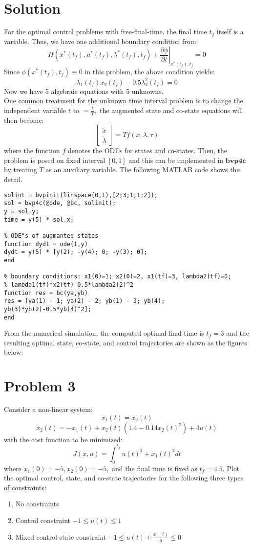 \documentclass[10pt,a4paper,oneside]{article}
\begin{document}
\section* {Solution} 
For the optimal control problems with free-final-time, the final time $t_{f}$ itself is a variable. Thus, we have one additional boundary condition from:
\[H\left(x^{*}\left(t_{f}\right), u^{*}\left(t_{f}\right), \lambda^{*}\left(t_{f}\right), t_{f}\right)+\left.\frac{\partial \phi}{\partial t}\right|_{x^{*}\left(t_{f}\right), t_{f}}=0\]
Since $\phi\left(x^{*}\left(t_{f}\right), t_{f}\right) \equiv 0$ in this problem, the above condition yields:
\[
\lambda_{1}\left(t_{f}\right) x_{2}\left(t_{f}\right)-0.5 \lambda_{2}^{2}\left(t_{f}\right)=0
\]
Now we have 5 algebraic equations with 5 unknowns.
\\One common treatment for the unknown time interval problem is to change the independent variable $t$ to $=\frac{t}{T},$ the
augmented state and co-state equations will then become:
\[\left[\begin{array}{l}{\dot{x}} \\ {\dot{\lambda}}\end{array}\right]=T f(x, \lambda, \tau)\]
where the function $f$ denotes the ODEs for states and co-states. Then, the problem is posed on fixed interval $[0,1]$ and this can be implemented in $\mathbf{bvp4c}$ by treating $T$ as an auxiliary variable. The following MATLAB code shows the detail.
\begin{lstlisting}
solint = bvpinit(linspace(0,1),[2;3;1;1;2]);
sol = bvp4c(@ode, @bc, solinit);
y = sol.y;
time = y(5) * sol.x;

% ODE"s of augmanted states
function dydt = ode(t,y)
dydt = y(5) * [y(2); -y(4); 0; -y(3); 0];
end

% boundary conditions: x1(0)=1; x2(0)=2, x1(tf)=3, lambda2(tf)=0;
% lambda1(tf)*x2(tf)-0.5*lambda2(2)^2
function res = bc(ya,yb)
res = [ya(1) - 1; ya(2) - 2; yb(1) - 3; yb(4); yb(3)*yb(2)-0.5*yb(4)^2];
end
\end{lstlisting}
From the numerical simulation, the computed optimal final time is $t_{f}=3$ and the resulting optimal state, co-state, and control trajectories are shown as the figures below:
\section* {Problem 3} 
Consider a non-linear system:
\[
\dot{x}_{1}(t)=x_{2}(t)
\]
\[
\dot{x}_{2}(t)=-x_{1}(t)+x_{2}(t)\left(1.4-0.14 x_{2}(t)^{2}\right)+4 u(t)
\]
with the cost function to be minimized:
\[
J(x, u)=\int_{0}^{t_{f}} u(t)^{2}+x_{1}(t)^{2} d t
\]
where $x_{1}(0)=-5, x_{2}(0)=-5,$ and the final time is fixed as $t_{f}=4.5 .$ Plot the optimal control, state, and co-state trajectories for the following three types of constraints:
\begin{enumerate}
\item No constraints
\item Control constraint $-1 \leq u(t) \leq 1$
\item Mixed control-state constraint $-1 \leq u(t)+\frac{x_{1}(t)}{6} \leq 0$
\end{enumerate}
\end{document}
